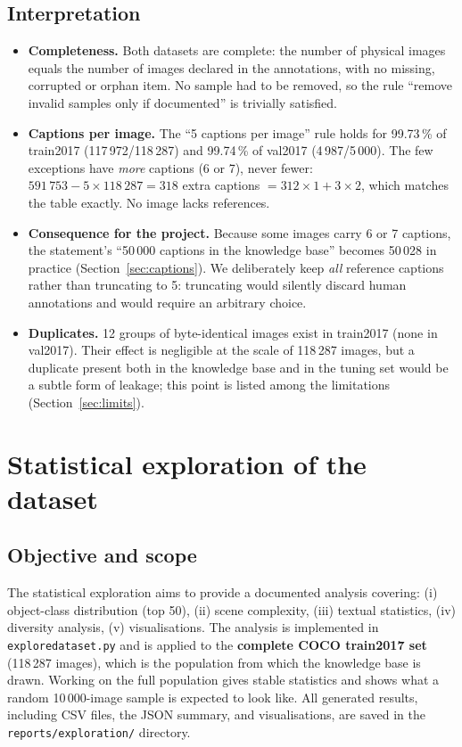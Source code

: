\documentclass[11pt,a4paper]{article}
\renewcommand{\_}{\textunderscore\allowbreak{}}
\newcommand{\code}[1]{\texttt{#1}}
\begin{document}
\subsection{Interpretation}
\begin{interp}
\begin{itemize}[nosep]
  \item \textbf{Completeness.} Both datasets are complete: the number of physical images equals the number of images declared in the annotations, with no missing, corrupted or orphan item. No sample had to be removed, so the rule ``remove invalid samples only if documented'' is trivially satisfied.
  \item \textbf{Captions per image.} The ``5 captions per image'' rule holds for 99.73\,\% of train2017 (117\,972/118\,287) and 99.74\,\% of val2017 (4\,987/5\,000). The few exceptions have \emph{more} captions (6 or 7), never fewer: $591\,753-5\times118\,287=318$ extra captions $=312\times1+3\times2$, which matches the table exactly. No image lacks references.
  \item \textbf{Consequence for the project.} Because some images carry 6 or 7 captions, the statement's ``50\,000 captions in the knowledge base'' becomes 50\,028 in practice (Section~\ref{sec:captions}). We deliberately keep \emph{all} reference captions rather than truncating to 5: truncating would silently discard human annotations and would require an arbitrary choice.
  \item \textbf{Duplicates.} 12 groups of byte-identical images exist in train2017 (none in val2017). Their effect is negligible at the scale of 118\,287 images, but a duplicate present both in the knowledge base and in the tuning set would be a subtle form of leakage; this point is listed among the limitations (Section~\ref{sec:limits}).
\end{itemize}
\end{interp}


\section{Statistical exploration of the dataset}
\label{sec:explore}

\subsection{Objective and scope}
The statistical exploration aims to provide a documented analysis covering: (i) object-class distribution (top 50), (ii) scene complexity, (iii) textual statistics, (iv) diversity analysis, (v) visualisations. The analysis is implemented in \code{explore\_dataset.py} and is applied to the \textbf{complete COCO train2017 set} (118\,287 images), which is the population from which the knowledge base is drawn. Working on the full population gives stable statistics and shows what a random 10\,000-image sample is expected to look like.
All generated results, including CSV files, the JSON summary, and visualisations, are saved in the \code{reports/exploration/} directory.
\end{document}
